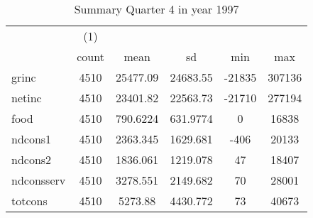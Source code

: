 \begin{table}[htbp]\centering
\def\sym#1{\ifmmode^{#1}\else\(^{#1}\)\fi}
\caption{Summary Quarter 4 in year 1997 \label{sum\_Q4\_y1997}}
\begin{tabular}{l*{1}{ccccc}}
\hline\hline
            &\multicolumn{1}{c}{(1)}&            &            &            &            \\
            &       count&        mean&          sd&         min&         max\\
\hline
grinc       &        4510&    25477.09&    24683.55&      -21835&      307136\\
netinc      &        4510&    23401.82&    22563.73&      -21710&      277194\\
food        &        4510&    790.6224&    631.9774&           0&       16838\\
ndcons1     &        4510&    2363.345&    1629.681&        -406&       20133\\
ndcons2     &        4510&    1836.061&    1219.078&          47&       18407\\
ndconsserv  &        4510&    3278.551&    2149.682&          70&       28001\\
totcons     &        4510&     5273.88&    4430.772&          73&       40673\\
\hline\hline
\end{tabular}
\end{table}
